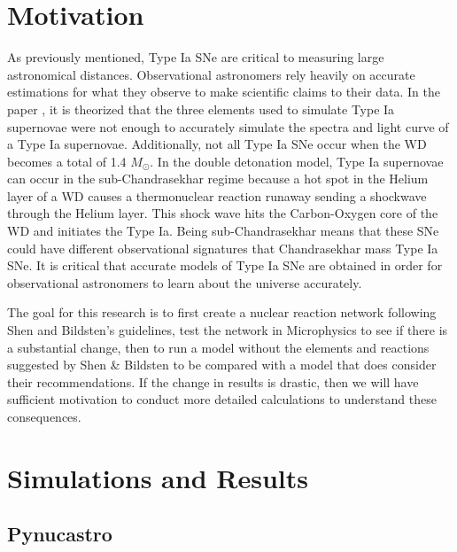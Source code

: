 \documentclass[preprint]{aastex62}
\begin{document}
\section{Motivation}
  
  As previously mentioned, Type Ia SNe are critical to measuring large astronomical distances. Observational astronomers rely heavily on accurate estimations for what they observe to make scientific claims to their data. In the paper \citet{shenNbildsten}, it is theorized that the three elements used to simulate Type Ia supernovae were not enough to accurately simulate the spectra and light curve of a Type Ia supernovae. Additionally, not all Type Ia SNe occur when the WD becomes a total of 1.4 $M_{\odot}$. In the double detonation model, Type Ia supernovae can occur in the sub-Chandrasekhar regime because a hot spot in the Helium layer of a WD causes a thermonuclear reaction runaway sending a shockwave through the Helium layer. This shock wave hits the Carbon-Oxygen core of the WD and initiates the Type Ia. Being sub-Chandrasekhar means that these SNe could have different observational signatures that Chandrasekhar mass Type Ia SNe. It is critical that accurate models of Type Ia SNe are obtained in order for observational astronomers to learn about the universe accurately. 
  
  The goal for this research is to first create a nuclear reaction network following Shen and Bildsten's guidelines, test the network in Microphysics to see if there is a substantial change, then to run a model without the elements and reactions suggested by Shen \& Bildsten to be compared with a model that does consider their recommendations. If the change in results is drastic, then we will have sufficient motivation to conduct more detailed calculations to understand these consequences. 
  
\section{Simulations and Results}
  
  \subsection{Pynucastro}
    
\end{document}
